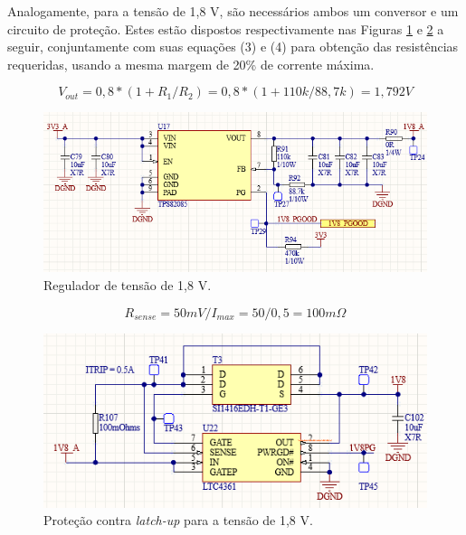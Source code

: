 Analogamente, para a tensão de 1,8 V, são necessários ambos um conversor e um circuito de proteção. Estes estão dispostos respectivamente nas Figuras \ref{fig:1v8supp} e \ref{fig:1v8ocp} a seguir, conjuntamente com suas equações (3) e (4) para obtenção das resistências requeridas, usando a mesma margem de 20\% de corrente máxima. 

\begin{equation}
	V_{out} = 0,8 * (1 + R_1/R_2) = 0,8 * (1+ 110k/88,7k) = 1,792 V
\end{equation} 

\begin{figure}[H]
    \centering
    \includegraphics[scale=0.8]{images/1v8supp.png}
    \caption{Regulador de tensão de 1,8 V.}
    \label{fig:1v8supp}
\end{figure}

\begin{equation}
	R_{sense} = 50 mV / I_{max} =50 / 0,5 = 100 m\Omega
\end{equation} 

\begin{figure}[H]
    \centering
    \includegraphics[scale=1]{images/1v8ocp.png}
    \caption{Proteção contra \textit{latch-up} para a tensão de 1,8 V.}
    \label{fig:1v8ocp}
\end{figure}

